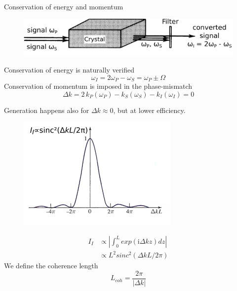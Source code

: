 \documentclass[11pt, leqno]{beamer}
\begin{document}
\begin{frame}{Conservation of energy and momentum}
	\begin{figure}
		\centering
		\vspace{10pt}
		\includegraphics[width=.8\textwidth]{setup_b&w.png}
	\end{figure}
	Conservation of energy is naturally verified
	\begin{equation}
		\omega_I = 2\omega_P - \omega_S = \omega_P \pm \Omega
		\label{eq_energy}
	\end{equation}
	Conservation of momentum is imposed in the phase-mismatch
	\begin{equation}
		\Delta k = 2\,k_P(\omega_P) - k_S(\omega_S) -k_I(\omega_I) = 0
		\label{eq_momentum}
	\end{equation}
\end{frame}
\begin{frame}
	Generation happens also for $\Delta k \approx 0$, but at lower efficiency.
	\begin{figure}
		\vspace{10pt}
		\centering
	    \includegraphics[width=.5\textwidth]{sinc2.png}
	\end{figure}
	\begin{equation}
	\begin{split}
		I_I &\propto \left| \int_0^L exp(\mathrm{i}\Delta k z)dz\right| \\
			&\propto L^2 sinc^2(\Delta k L/ 2\pi)
	\end{split}
	\end{equation}
	We define the coherence length
	\begin{equation}
		L_{coh} = \frac{2\pi}{|\Delta k|}
	\label{eq_coherence_length}
	\end{equation}
\end{frame}
\end{document}

